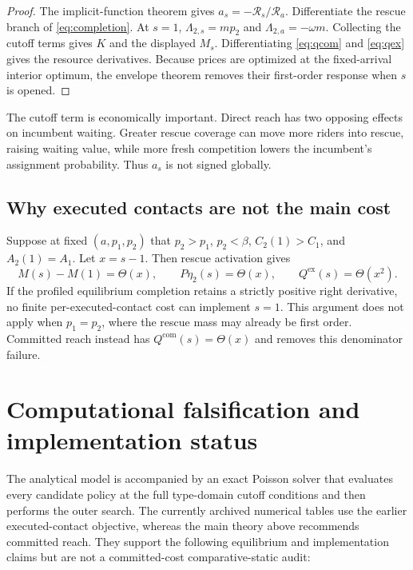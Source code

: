\documentclass[11pt]{article}
\theoremstyle{definition}
\theoremstyle{remark}
\newcommand{\com}{\mathrm{com}}
\newcommand{\ex}{\mathrm{ex}}
\begin{document}
\begin{proof}
The implicit-function theorem gives $a_s=-\mathcal R_s/\mathcal R_a$.
Differentiate the rescue branch of \eqref{eq:completion}.  At $s=1$,
$\Lambda_{2,s}=mp_2$ and $\Lambda_{2,a}=-\omega m$.  Collecting the cutoff
terms gives $K$ and the displayed $M_s$.  Differentiating
\eqref{eq:qcom} and \eqref{eq:qex} gives the resource derivatives.  Because
prices are optimized at the fixed-arrival interior optimum, the envelope
theorem removes their first-order response when $s$ is opened.
\end{proof}

The cutoff term is economically important.  Direct reach has two opposing
effects on incumbent waiting.  Greater rescue coverage can move more riders
into rescue, raising waiting value, while more fresh competition lowers the
incumbent's assignment probability.  Thus $a_s$ is not signed globally.

\subsection{Why executed contacts are not the main cost}

Suppose at fixed $(a,p_1,p_2)$ that $p_2>p_1$, $p_2<\beta$,
$C_2(1)>C_1$, and $A_2(1)=A_1$.  Let $x=s-1$.  Then rescue activation gives
\[
M(s)-M(1)=\Theta(x),\qquad
P\eta_2(s)=\Theta(x),\qquad
Q^{\ex}(s)=\Theta(x^2).
\]
If the profiled equilibrium completion retains a strictly positive right
derivative, no finite per-executed-contact cost can implement $s=1$.  This
argument does not apply when $p_1=p_2$, where the rescue mass may already be
first order.  Committed reach instead has
$Q^{\com}(s)=\Theta(x)$ and removes this denominator failure.

\section{Computational falsification and implementation status}

The analytical model is accompanied by an exact Poisson solver that evaluates
every candidate policy at the full type-domain cutoff conditions and then
performs the outer search.  The currently archived numerical tables use the
earlier executed-contact objective, whereas the main theory above recommends
committed reach.  They support the following equilibrium and implementation
claims but are not a committed-cost comparative-static audit:
\end{document}
